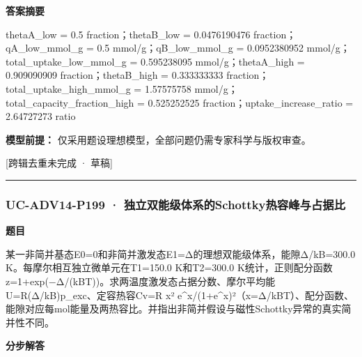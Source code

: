 \documentclass[UTF8,11pt,a4paper]{ctexart}
\begin{document}
\noindent\textbf{答案摘要}\par
thetaA\_low = 0.5 fraction；thetaB\_low = 0.0476190476 fraction；qA\_low\_mmol\_g = 0.5 mmol/g；qB\_low\_mmol\_g = 0.0952380952 mmol/g；total\_uptake\_low\_mmol\_g = 0.595238095 mmol/g；thetaA\_high = 0.909090909 fraction；thetaB\_high = 0.333333333 fraction；total\_uptake\_high\_mmol\_g = 1.57575758 mmol/g；total\_capacity\_fraction\_high = 0.525252525 fraction；uptake\_increase\_ratio = 2.64727273 ratio\par
\noindent\textbf{模型前提：}
仅采用题设理想模型，全部问题仍需专家科学与版权审查。\par
\noindent\textcolor{red!65!black}{[跨辑去重未完成 · 草稿]} \par
\medskip\hrule\medskip
{}
\subsubsection*{UC-ADV14-P199 · 独立双能级体系的Schottky热容峰与占据比}
\noindent\textbf{题目}\par
某一非简并基态E0=0和非简并激发态E1=Δ的理想双能级体系，能隙Δ/kB=300.0 K。每摩尔相互独立微单元在T1=150.0 K和T2=300.0 K统计，正则配分函数z=1+exp(−Δ/(kBT))。求两温度激发态占据分数、摩尔平均能U=R(Δ/kB)p\_exc、定容热容Cv=R x² e\textasciicircum{}x/(1+e\textasciicircum{}x)²（x=Δ/kBT）、配分函数、能隙对应每mol能量及两热容比。并指出非简并假设与磁性Schottky异常的真实简并性不同。\par
\medskip\noindent\textbf{分步解答}
\end{document}

